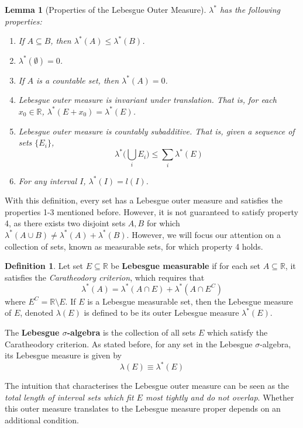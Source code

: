 \documentclass{article}
\newtheorem{lemma}[theorem]{Lemma}
\theoremstyle{remark}
\theoremstyle{definition}
\newtheorem{definition}{Definition}[section]
\begin{document}
\begin{lemma}[Properties of the Lebesgue Outer Measure]
$\lambda^*$ has the following properties: 
\begin{enumerate}
    \item If $A \subseteq B$, then $\lambda^* (A) \leq \lambda^*(B)$. 
    \item $\lambda^* (\emptyset) = 0$. 
    \item If $A$ is a countable set, then $\lambda^* (A) = 0$. 
    \item Lebesgue outer measure is invariant under translation. That is, for each $x_0 \in \mathbb{R}$, $\lambda^* (E + x_0) = \lambda^* (E)$. 
    \item Lebesgue outer measure is countably subadditive. That is, given a sequence of sets $\{E_i\}$, 
    \[\lambda^* \bigg( \bigcup_i E_i \bigg) \leq \sum_i \lambda^* (E)\]
    \item For any interval $I$, $\lambda^* (I) = l(I)$.
\end{enumerate}
\end{lemma}

With this definition, every set has a Lebesgue outer measure and satisfies the properties 1-3 mentioned before. However, it is not guaranteed to satisfy property 4, as there exists two disjoint sets $A, B$ for which $\lambda^* (A \cup B) \neq \lambda^* (A) + \lambda^* (B)$. However, we will focus our attention on a collection of sets, known as measurable sets, for which property 4 holds. 

\begin{definition}
Let set $E \subseteq \mathbb{R}$ be \textbf{Lebesgue measurable} if for each set $A \subseteq \mathbb{R}$, it satisfies the \textit{Caratheodory criterion}, which requires that
\[\lambda^* (A) = \lambda^* (A \cap E) + \lambda^* (A \cap E^C)\]
where $E^C = \mathbb{R} \setminus E$. If $E$ is a Lebesgue measurable set, then the Lebesgue measure of $E$, denoted $\lambda(E)$ is defined to be its outer Lebesgue measure $\lambda^* (E)$. 

The \textbf{Lebesgue $\sigma$-algebra} is the collection of all sets $E$ which satisfy the Caratheodory criterion. As stated before, for any set in the Lebesgue $\sigma$-algebra, its Lebesgue measure is given by 
\[\lambda (E) \equiv \lambda^* (E)\]
\end{definition}

The intuition that characterises the Lebesgue outer measure can be seen as the \textit{total length of interval sets which fit $E$ most tightly and do not overlap}. Whether this outer measure translates to the Lebesgue measure proper depends on an additional condition. 
\end{document}
